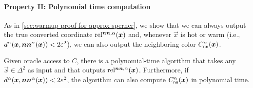\paragraph{Property II: Polynomial time computation}
As in \cref{sec:warmup-proof-for-approx-sperner}, we show that we can always output the true converted coordinate $\rela(\vec{x})$ and, whenever $\vec{x}$ is hot or warm (i.e., $d^\alpha(\vec{x}, \nna(\vec{x}))<2\eps^2$), we can also output the neighboring color $C^\alpha_{\sf nn}(\vec{x})$.
\begin{lemma}
    \label{lem:poly-time-oracle-and-converter-for-symmetry}
    Given oracle access to $C$, there is a polynomial-time algorithm that takes any $\vec{x}\in \Delta^2$ as input and that outputs $\rela(\vec{x})$.
    Furthermore, if $d^\alpha(\vec{x}, \nna(\vec{x}))<2\eps^2$, the algorithm can also compute $C^\alpha_{\sf nn}(\vec{x})$ in polynomial time.
\end{lemma}
